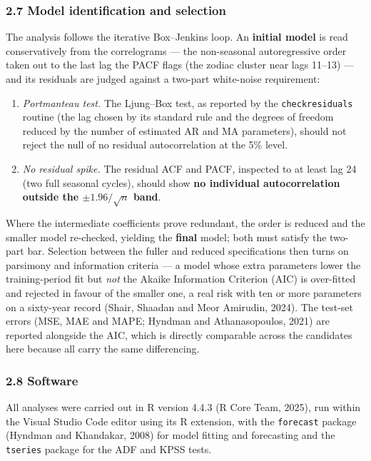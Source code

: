 \documentclass[
  11pt,
]{article}
\providecommand{\tightlist}{%
  \setlength{\itemsep}{0pt}\setlength{\parskip}{0pt}}
\begin{document}
\subsubsection{2.7 Model identification and
selection}\label{model-identification-and-selection}

The analysis follows the iterative Box--Jenkins loop. An \textbf{initial
model} is read conservatively from the correlograms --- the non-seasonal
autoregressive order taken out to the last lag the PACF flags (the
zodiac cluster near lags 11--13) --- and its residuals are judged
against a two-part white-noise requirement:

\begin{enumerate}
\def\labelenumi{\arabic{enumi}.}
\tightlist
\item
  \emph{Portmanteau test.} The Ljung--Box test, as reported by the
  \texttt{checkresiduals} routine (the lag chosen by its standard rule
  and the degrees of freedom reduced by the number of estimated AR and
  MA parameters), should not reject the null of no residual
  autocorrelation at the 5\% level.
\item
  \emph{No residual spike.} The residual ACF and PACF, inspected to at
  least lag 24 (two full seasonal cycles), should show \textbf{no
  individual autocorrelation outside the \(\pm 1.96/\sqrt{n}\) band}.
\end{enumerate}

Where the intermediate coefficients prove redundant, the order is
reduced and the smaller model re-checked, yielding the \textbf{final}
model; both must satisfy the two-part bar. Selection between the fuller
and reduced specifications then turns on parsimony and information
criteria --- a model whose extra parameters lower the training-period
fit but \emph{not} the Akaike Information Criterion (AIC) is over-fitted
and rejected in favour of the smaller one, a real risk with ten or more
parameters on a sixty-year record (Shair, Shaadan and Meor Amirudin,
2024). The test-set errors (MSE, MAE and MAPE; Hyndman and
Athanasopoulos, 2021) are reported alongside the AIC, which is directly
comparable across the candidates here because all carry the same
differencing.

\subsubsection{2.8 Software}\label{software}

All analyses were carried out in R version 4.4.3 (R Core Team, 2025),
run within the Visual Studio Code editor using its R extension, with the
\texttt{forecast} package (Hyndman and Khandakar, 2008) for model
fitting and forecasting and the \texttt{tseries} package for the ADF and
KPSS tests.
\end{document}
